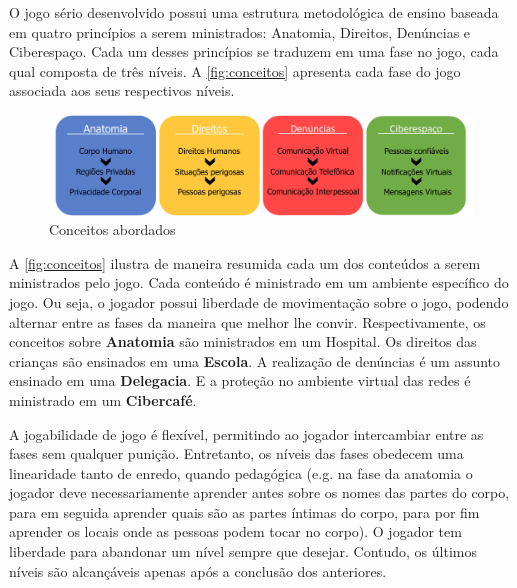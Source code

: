 
O jogo sério desenvolvido possui uma estrutura metodológica de ensino baseada em quatro princípios a serem ministrados: Anatomia, Direitos, Denúncias e Ciberespaço. Cada um desses princípios se traduzem em uma fase no jogo, cada qual composta de três níveis. A \autoref{fig:conceitos} apresenta cada fase do jogo associada aos seus respectivos níveis.


\begin{figure}[hbt!]
  \caption{\label{fig:conceitos}Conceitos abordados}
  \begin{center}
    \includegraphics[width=\linewidth]{./Figuras/EsquemaFases.pdf}
    \end{center}
  
\end{figure}

A \autoref{fig:conceitos} ilustra de maneira resumida cada um dos conteúdos a serem ministrados pelo jogo. Cada conteúdo é ministrado em um ambiente específico do jogo. Ou seja, o jogador possui liberdade de movimentação sobre o jogo, podendo alternar entre as fases da maneira que melhor lhe convir. Respectivamente, os conceitos sobre \textbf{Anatomia} são ministrados em um Hospital. Os direitos das crianças são ensinados em uma \textbf{Escola}. A realização de denúncias é um assunto ensinado em uma \textbf{Delegacia}. E a proteção no ambiente virtual das redes é ministrado em um \textbf{Cibercafé}.

A jogabilidade de jogo é flexível, permitindo ao jogador intercambiar entre as fases sem qualquer punição. Entretanto, os níveis das fases obedecem uma linearidade tanto de enredo, quando pedagógica (e.g. na fase da anatomia o jogador deve necessariamente aprender antes sobre os nomes das partes do corpo, para em seguida aprender quais são as partes íntimas do corpo, para por fim aprender os locais onde as pessoas podem tocar no corpo). O jogador tem liberdade para abandonar um nível sempre que desejar. Contudo, os últimos níveis são alcançáveis apenas após a conclusão dos anteriores. 

